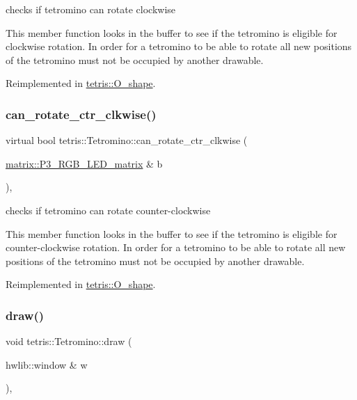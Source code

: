 checks if tetromino can rotate clockwise 

This member function looks in the buffer to see if the tetromino is eligible for clockwise rotation. In order for a tetromino to be able to rotate all new positions of the tetromino must not be occupied by another drawable. 

Reimplemented in \hyperlink{classtetris_1_1O__shape_a92c7b336c7d3f696f24b8675ec9faed9}{tetris\+::\+O\+\_\+shape}.

\mbox{\label{classtetris_1_1Tetromino_a0c0646597824b901b9b22a5b1b9d6436}} 
\subsubsection{\texorpdfstring{can\+\_\+rotate\+\_\+ctr\+\_\+clkwise()}{can\_rotate\_ctr\_clkwise()}}
{\footnotesize\ttfamily virtual bool tetris\+::\+Tetromino\+::can\+\_\+rotate\+\_\+ctr\+\_\+clkwise (\begin{DoxyParamCaption}\item[{\hyperlink{classmatrix_1_1P3__RGB__LED__matrix}{matrix\+::\+P3\+\_\+\+R\+G\+B\+\_\+\+L\+E\+D\+\_\+matrix} \&}]{b }\end{DoxyParamCaption})\hspace{0.3cm}{\ttfamily [inline]}, {\ttfamily [virtual]}}



checks if tetromino can rotate counter-\/clockwise 

This member function looks in the buffer to see if the tetromino is eligible for counter-\/clockwise rotation. In order for a tetromino to be able to rotate all new positions of the tetromino must not be occupied by another drawable. 

Reimplemented in \hyperlink{classtetris_1_1O__shape_ae53421645f59627b6c6c7d26a59f2d6a}{tetris\+::\+O\+\_\+shape}.

\mbox{\label{classtetris_1_1Tetromino_a3dabc26c500e8da90bbfb0347729afc6}} 
\subsubsection{\texorpdfstring{draw()}{draw()}}
{\footnotesize\ttfamily void tetris\+::\+Tetromino\+::draw (\begin{DoxyParamCaption}\item[{hwlib\+::window \&}]{w }\end{DoxyParamCaption})\hspace{0.3cm}{\ttfamily [inline]}, {\ttfamily [override]}}



